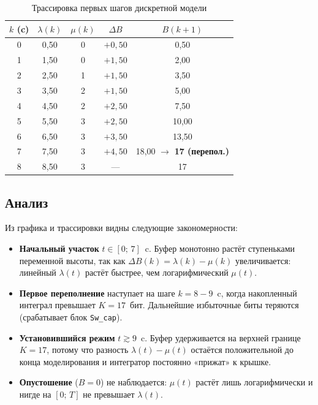 \documentclass[a4paper,12pt]{article}
\begin{document}
\begin{table}[h!]
    \centering
    \caption{Трассировка первых шагов дискретной модели}
    \label{tab:trace3}
    \begin{tabular}{|c|c|c|c|c|}
        \hline
        $k$ (c) & $\lambda(k)$ & $\mu(k)$ & $\Delta B$ & $B(k{+}1)$ \\
        \hline
        0 & 0{,}50 & 0 & $+0{,}50$ & 0{,}50 \\
        1 & 1{,}50 & 0 & $+1{,}50$ & 2{,}00 \\
        2 & 2{,}50 & 1 & $+1{,}50$ & 3{,}50 \\
        3 & 3{,}50 & 2 & $+1{,}50$ & 5{,}00 \\
        4 & 4{,}50 & 2 & $+2{,}50$ & 7{,}50 \\
        5 & 5{,}50 & 3 & $+2{,}50$ & 10{,}00 \\
        6 & 6{,}50 & 3 & $+3{,}50$ & 13{,}50 \\
        7 & 7{,}50 & 3 & $+4{,}50$ & 18{,}00 $\rightarrow$ \textbf{17 (перепол.)} \\
        8 & 8{,}50 & 3 & --- & 17 \\
        \hline
    \end{tabular}
\end{table}

\subsection*{Анализ}
Из графика и трассировки видны следующие закономерности:

\begin{itemize}
    \item \textbf{Начальный участок} $t\in[0;\,7]$~c. Буфер монотонно растёт ступеньками
          переменной высоты, так как $\Delta B(k)=\lambda(k)-\mu(k)$ увеличивается:
          линейный $\lambda(t)$ растёт быстрее, чем логарифмический $\mu(t)$.
    \item \textbf{Первое переполнение} наступает на шаге $k=8{-}9$~c, когда накопленный
          интеграл превышает $K=17$~бит. Дальнейшие избыточные биты теряются
          (срабатывает блок \texttt{Sw\_cap}).
    \item \textbf{Установившийся режим} $t \gtrsim 9$~c. Буфер удерживается на верхней
          границе $K=17$, потому что разность $\lambda(t)-\mu(t)$ остаётся
          положительной до конца моделирования и интегратор постоянно «прижат» к крышке.
    \item \textbf{Опустошение} ($B=0$) не наблюдается: $\mu(t)$ растёт лишь
          логарифмически и нигде на $[0;\,T]$ не превышает $\lambda(t)$.
\end{itemize}
\end{document}
